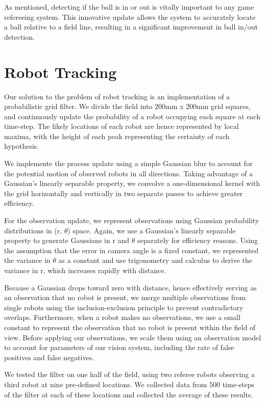 \documentclass[runningheads,a4paper]{llncs}
\begin{document}
As mentioned, detecting if the ball is in or out is vitally important to any game refereeing system. This innovative update allows the system to accurately locate a ball relative to a field line, resulting in a significant improvement in ball in/out detection. 

\section {Robot Tracking}

Our solution to the problem of robot tracking is an implementation of a probabilistic grid filter.\cite{ProbabilisticRobotics} We divide the field into 200mm x 200mm grid squares, and continuously update the probability of a robot occupying each square at each time-step. The likely locations of each robot are hence represented by local maxima, with the height of each peak representing the certainty of each hypothesis.

We implemente the process update using a simple Gaussian blur to account for the potential motion of observed robots in all directions. Taking advantage of a Gaussian's linearly separable property, we convolve a one-dimensional kernel with the grid horizontally and vertically in two separate passes to achieve greater efficiency.

For the observation update, we represent observations using Gaussian probability distributions in (r, $\theta$) space. Again, we use a Gaussian's linearly separable property to generate Gaussians in r and $\theta$ separately for efficiency reasons. Using the assumption that the error in camera angle is a fixed constant, we represented the variance in $\theta$ as a constant and use trigonometry and calculus to derive the variance in r, which increases rapidly with distance.

Because a Gaussian drops toward zero with distance, hence effectively serving as an observation that no robot is present, we merge multiple observations from single robots using the inclusion-exclusion principle to prevent contradictory overlaps. Furthermore, when a robot makes no observations, we use a small constant to represent the observation that no robot is present within the field of view. Before applying our observations, we scale them using an observation model to account for parameters of our vision system, including the rate of false positives and false negatives.

We tested the filter on one half of the field, using two referee robots observing a third robot at nine pre-defined locations. We collected data from 500 time-steps of the filter at each of these locations and collected the average of these results.
\end{document}
